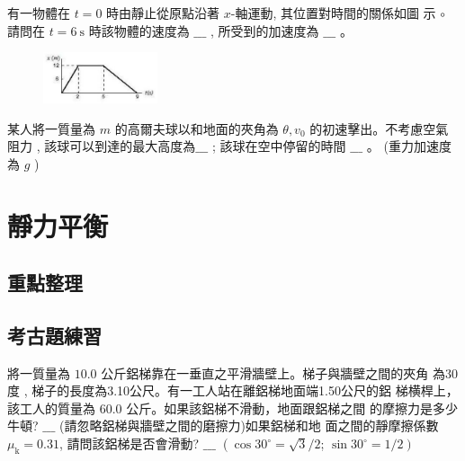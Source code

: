 \documentclass[cn,10pt,math=newtx,chinesefont=founder]{../elegantbook}
\begin{document}
\begin{example}
    有一物體在 $t=0$ 時由靜止從原點沿著 $x$-軸運動, 其位置對時間的關係如圖 示 $\circ$ 請問在 $t=6 \mathrm{~s}$ 時該物體的速度為 $\_\_\_$ , 所受到的加速度為 $\_\_\_$ 。
\end{example}
\begin{solution}
    
\end{solution}
\begin{figure}[htbp]
    \flushright
    \includegraphics[width=0.3\textwidth]{image/1.jpeg}
\end{figure}
\vspace{6cm}



\begin{example}
    某人將一質量為 $m$ 的高爾夫球以和地面的夾角為 $\theta, v_{0}$ 的初速擊出。不考慮空氣阻力 , 該球可以到達的最大高度為$\_\_\_$ ; 該球在空中停留的時間 $\_\_\_$ 。 (重力加速度為 $g$ )
\end{example}
\begin{solution}
    
\end{solution}
\newpage


\section{靜力平衡}
\subsection{重點整理}
\newpage
\subsection{考古題練習}
\begin{example}
    將一質量為 $10.0$ 公斤鋁梯靠在一垂直之平滑牆壁上。梯子與牆壁之間的夾角 為30度 , 梯子的長度為3.10公尺。有一工人站在離鋁梯地面端1.50公尺的鋁 梯横桿上，該工人的質量為 $60.0$ 公斤。如果該鋁梯不滑動，地面跟鋁梯之間 的摩擦力是多少牛頓? $\_\_\_$ (請忽略鋁梯與牆壁之間的磨擦力)如果鋁梯和地 面之間的靜摩擦係數 $\mu_{\mathrm{k}}=0.31$, 請問該鋁梯是否會滑動? $\_\_\_$ $\left(\cos 30^{\circ}=\sqrt{3} / 2\right.$; $\left.\sin 30^{\circ}=1 / 2\right)$ 
\end{example}
\begin{solution}

\end{solution}
\begin{note}
\end{note}
\newpage
\end{document}
